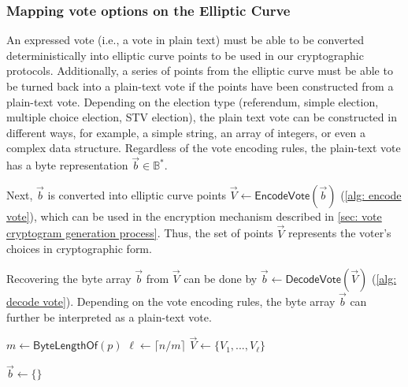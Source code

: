 \subsubsection{Mapping vote options on the Elliptic Curve} \label{sec: mapping vote options on the elliptic curve}
An expressed vote (i.e., a vote in plain text) must be able to be converted deterministically into elliptic curve points to be used in our cryptographic protocols. Additionally, a series of points from the elliptic curve must be able to be turned back into a plain-text vote if the points have been constructed from a plain-text vote. Depending on the election type (referendum, simple election, multiple choice election, STV election), the plain text vote can be constructed in different ways, for example, a simple string, an array of integers, or even a complex data structure. Regardless of the vote encoding rules, the plain-text vote has a byte representation $\vec{b} \in \mathbb{B}^*$.

Next, $\vec{b}$ is converted into elliptic curve points $\vec{V} \gets \mathsf{EncodeVote}(\vec{b})$ (\cref{alg: encode vote}), which can be used in the encryption mechanism described in \cref{sec: vote cryptogram generation process}. Thus, the set of points $\vec{V}$ represents the voter's choices in cryptographic form.

Recovering the byte array $\vec{b}$ from $\vec{V}$ can be done by $\vec{b} \gets \mathsf{DecodeVote}(\vec{V})$ (\cref{alg: decode vote}). Depending on the vote encoding rules, the byte array $\vec{b}$ can further be interpreted as a plain-text vote.

\begin{algorithm}[ht]
    \DontPrintSemicolon
    \caption{$\mathsf{EncodeVote} (\vec{b})$}
    \label{alg: encode vote}
    
    $m \gets \mathsf{ByteLengthOf} (p)$  \;
    $\ell \gets \lceil n / m \rceil$ \;
    $\vec{V} \gets \{ V_1, ..., V_\ell \}$ \;
     
\end{algorithm}

\begin{algorithm}[ht]
    \DontPrintSemicolon
    \caption{$\mathsf{DecodeVote} (\vec{V})$}
    \label{alg: decode vote}
    
    $\vec{b} \gets \{ \}$  \;
     
\end{algorithm}


